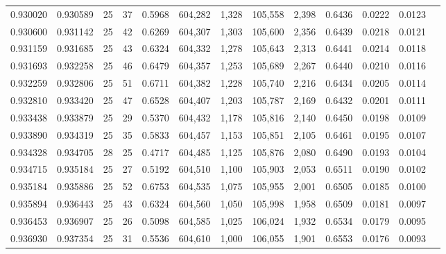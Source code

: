 \begin{tabular}{rrrrrrrrrrrrr}
0.930020 & 0.930589 &    25 &  37 &                                     0.5968 & 604,282 &   1,328 & 105,558 &   2,398 & 0.6436 & 0.0222 & 0.0123 \\
0.930600 & 0.931142 &    25 &  42 &                                     0.6269 & 604,307 &   1,303 & 105,600 &   2,356 & 0.6439 & 0.0218 & 0.0121 \\
0.931159 & 0.931685 &    25 &  43 &                                     0.6324 & 604,332 &   1,278 & 105,643 &   2,313 & 0.6441 & 0.0214 & 0.0118 \\
0.931693 & 0.932258 &    25 &  46 &                                     0.6479 & 604,357 &   1,253 & 105,689 &   2,267 & 0.6440 & 0.0210 & 0.0116 \\
0.932259 & 0.932806 &    25 &  51 &                                     0.6711 & 604,382 &   1,228 & 105,740 &   2,216 & 0.6434 & 0.0205 & 0.0114 \\
0.932810 & 0.933420 &    25 &  47 &                                     0.6528 & 604,407 &   1,203 & 105,787 &   2,169 & 0.6432 & 0.0201 & 0.0111 \\
0.933438 & 0.933879 &    25 &  29 &                                     0.5370 & 604,432 &   1,178 & 105,816 &   2,140 & 0.6450 & 0.0198 & 0.0109 \\
0.933890 & 0.934319 &    25 &  35 &                                     0.5833 & 604,457 &   1,153 & 105,851 &   2,105 & 0.6461 & 0.0195 & 0.0107 \\
0.934328 & 0.934705 &    28 &  25 &                                     0.4717 & 604,485 &   1,125 & 105,876 &   2,080 & 0.6490 & 0.0193 & 0.0104 \\
0.934715 & 0.935184 &    25 &  27 &                                     0.5192 & 604,510 &   1,100 & 105,903 &   2,053 & 0.6511 & 0.0190 & 0.0102 \\
0.935184 & 0.935886 &    25 &  52 &                                     0.6753 & 604,535 &   1,075 & 105,955 &   2,001 & 0.6505 & 0.0185 & 0.0100 \\
0.935894 & 0.936443 &    25 &  43 &                                     0.6324 & 604,560 &   1,050 & 105,998 &   1,958 & 0.6509 & 0.0181 & 0.0097 \\
0.936453 & 0.936907 &    25 &  26 &                                     0.5098 & 604,585 &   1,025 & 106,024 &   1,932 & 0.6534 & 0.0179 & 0.0095 \\
0.936930 & 0.937354 &    25 &  31 &                                     0.5536 & 604,610 &   1,000 & 106,055 &   1,901 & 0.6553 & 0.0176 & 0.0093 \\

\end{tabular}
